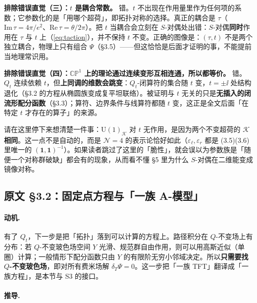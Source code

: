 \begin{warn}
\textbf{排除错误直觉（三）：$t$ 是耦合常数。} 错。$t$ 不出现在作用量里作为任何项的系数；它参数化的是「用哪个超荷」，即拓扑对称的选择\pA{}。真正的耦合是 $\tau$（$\mathrm{Im}\,\tau=4\pi/e^2$、$\mathrm{Re}\,\tau=\theta/2\pi$）。把 $t$ 当耦合会立刻在 $S$-对偶处出错：$S$-对偶\textbf{同时}作用在 $\tau$ 与 $t$ 上（\eqref{eq:taction}），并不保持 $t$ 不变。正确的图像是：$(\tau,t)$ 不是两个独立耦合，物理上只有组合 $\Psi$（§3.5）——但这恰恰是后面才证明的事，不能提前当地理常识用。
\end{warn}

\begin{warn}
\textbf{排除错误直觉（四）：$\mathbb{CP}^1$ 上的理论通过连续变形互相连通，所以都等价。} 错。$Q_t$ 连续依赖 $t$，但\textbf{上同调的维数会跳变}：$Q_t$-闭算符的集合随 $t$ 变，$t=\pm\ii$ 处结构退化（§3.2 的方程从椭圆族变成复平坦联络）。被证明与 $t$ 无关的只是\textbf{无插入的闭流形配分函数}（§3.3）；算符、边界条件与线算符都随 $t$ 变，这正是全文后面「在特定 $t$ 才存在的算子」的来源\pA{}。
\end{warn}

\begin{stuck}
请在这里停下来想清楚一件事：$\mathrm U(1)_{\mathcal K}$ 对 $t$ 无作用，是因为两个不变超荷的 $\mathcal K$ \textbf{相同}。这一点不是自动的，而是 $\mathcal N=4$ 的表示论恰好如此（$\varepsilon_\ell,\varepsilon_r$ 都是 (3.5)(3.6) 里唯一的 $\mathbf{(1,1)}^{-1}$）。如果读者跳过了这里的「脆性」，就会误以为参数族是「随便一个对称群破缺」都会有的现象，从而看不懂 §5 里为什么 $S$-对偶在二维能变成镜像对称\pC{}。
\end{stuck}

\subsection{原文 §3.2：固定点方程与「一族 A-模型」}

\paragraph{动机.}
有了 $Q_t$，下一步是把「拓扑」落到可以计算的方程上。路径积分在 $Q$-不变场上有分布：若 $Q$-不变玻色场空间 $Y$ 光滑、规范群自由作用，则可以用高斯近似（单圈）计算；一般情形下配分函数只由 $Y$ 的有限阶无穷小邻域决定\pA{}。所以\textbf{只需要找 $Q$-不变玻色场}，即对所有费米场解 $\delta_T\Psi=0$。这一步把「一族 TFT」翻译成「一族方程」，是本节与 S3 的接口。

\paragraph{推导.}

